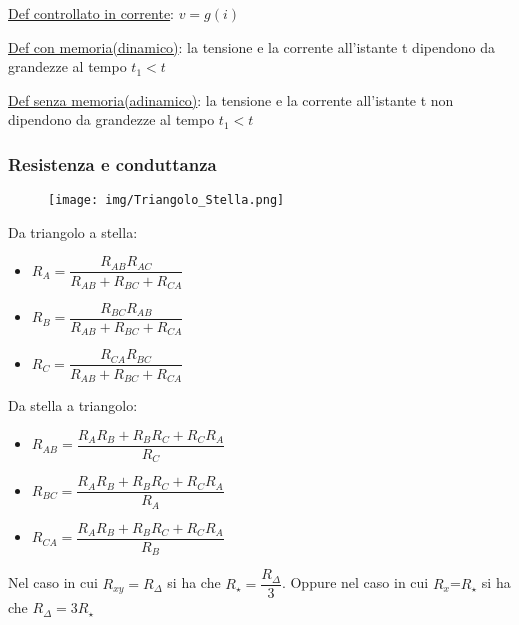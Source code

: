 \documentclass{article}
\begin{document}
\noindent \underline{Def controllato in corrente}: $v=g(i)$

\noindent \underline{Def con memoria(dinamico)}: la tensione e la corrente all'istante t dipendono da grandezze al tempo $t_1 < t$

\noindent \underline{Def senza memoria(adinamico)}: la tensione e la corrente all'istante t non dipendono da grandezze al tempo $t_1 < t$

\subsubsection{Resistenza e conduttanza}
\medskip
\noindent{}

\begin{figure}[h!]
    \begin{center}
        \texttt{[image: img/Triangolo\_Stella.png]}
    \end{center}
\end{figure}
\noindent Da triangolo a stella:\begin{itemize}
    \item $R_A=\dfrac{R_{AB}R_{AC}}{R_{AB}+R_{BC}+R_{CA}} $
    \item $R_B=\dfrac{R_{BC}R_{AB}}{R_{AB}+R_{BC}+R_{CA}} $
    \item $R_C=\dfrac{R_{CA}R_{BC}}{R_{AB}+R_{BC}+R_{CA}} $
\end{itemize}

\noindent Da stella a triangolo:\begin{itemize}
    \item $R_{AB}=\dfrac{R_{A}R_{B}+R_{B}R_C+R_{C}R_{A}}{R_C} $
    \item $R_{BC}=\dfrac{R_{A}R_{B}+R_{B}R_C+R_{C}R_{A}}{R_A} $
    \item $R_{CA}=\dfrac{R_{A}R_{B}+R_{B}R_C+R_{C}R_{A}}{R_B} $
\end{itemize}

\noindent Nel caso in cui $R_{xy}=R_{\Delta}$ si ha che $R_{\star}=\dfrac{R_{\Delta}}{3}$. Oppure nel caso in cui $R_x$=$R_{\star}$ si ha che 
$R_{\Delta}=3R_{\star}$
\end{document}
